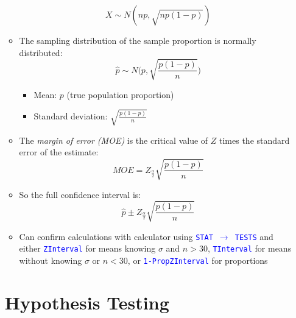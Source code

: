 \documentclass{article}
\begin{document}
\begin{itemize}
\begin{itemize}
\begin{equation*}
		X \sim N(np, \sqrt{np(1-p)})	
		\end{equation*}
		\item The sampling distribution of the sample proportion is normally distributed: 
		\begin{equation*}
		\hat{p} \sim N\bigg(p, \sqrt{\frac{p(1-p)}{n}}\bigg)	
		\end{equation*}
		\begin{itemize}
			\item Mean: $p$ (true population proportion)
			\item Standard deviation: $\sqrt{\frac{p(1-p)}{n}}$
	\end{itemize}
		\item The \emph{margin of error (MOE)} is the critical value of $Z$ times the standard error of the estimate: 
		\begin{equation*}
			MOE=Z_{\frac{\alpha}{2}}\sqrt{\frac{p(1-p)}{n}}	
		\end{equation*}
		\item So the full confidence interval is: 
			\begin{equation*}
			\hat{p} \pm Z_{\frac{\alpha}{2}}\sqrt{\frac{p(1-p)}{n}}
			\end{equation*}
	\item Can confirm calculations with calculator using \textcolor{blue}{\texttt{STAT $\rightarrow$ TESTS}} and either \textcolor{blue}{\texttt{ZInterval}} for means knowing $\sigma$ and $n>30$, \textcolor{blue}{\texttt{TInterval}} for means without knowing $\sigma$ or $n<30$, or \textcolor{blue}{\texttt{1-PropZInterval}} for proportions
	\end{itemize}

\clearpage 

\section{Hypothesis Testing}


\end{itemize}
\end{document}
